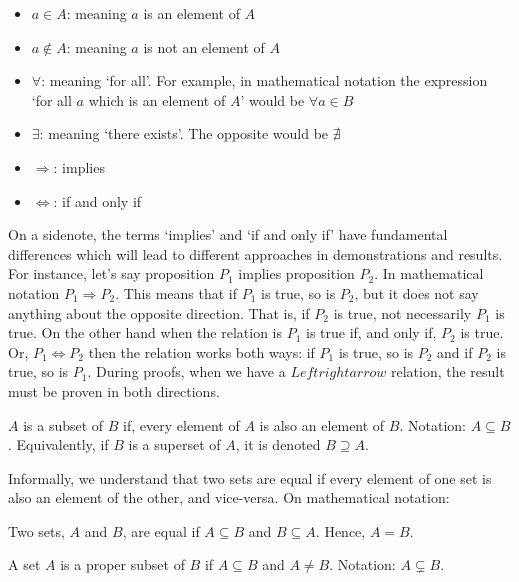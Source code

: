 \begin{itemize}
    \item $a \in A$: meaning $a$ is an element of $A$
    \item $a \notin A$: meaning $a$ is not an element of $A$
    \item $\forall$: meaning `for all'. For example, in mathematical notation the expression `for all $a$ which is an element of $A$' would be $\forall a \in B$
    \item $\exists$: meaning `there exists'. The opposite would be $\nexists$
    \item $\Rightarrow$: implies
    \item $\Leftrightarrow$: if and only if
\end{itemize}

On a sidenote, the terms `implies' and `if and only if' have fundamental differences which will lead to different approaches in demonstrations and results. For instance, let's say proposition $P_1$ implies proposition $P_2$. In mathematical notation $P_1 \Rightarrow P_2$. This means that if $P_1$ is true, so is  $P_2$, but it does not say anything about the opposite direction. That is, if $P_2$ is true, not necessarily $P_1$ is true. On the other hand when the relation is $P_1$ is true if, and only if, $P_2$ is true. Or, $P_1 \Leftrightarrow P_2$ then the relation works both ways: if $P_1$ is true, so is $P_2$ and if $P_2$ is true, so is $P_1$. During proofs, when we have a $Leftrightarrow$ relation, the result must be proven in both directions.

\begin{definition}[Subset]
    $A$ is a subset of $B$ if, every element of $A$ is also an element of $B$. Notation: $A \subseteq B$. Equivalently, if $B$ is a superset of $A$, it is denoted $B \supseteq A$.
\end{definition}

Informally, we understand that two sets are equal if every element of one set is also an element of the other, and vice-versa. On mathematical notation:

\begin{definition}
    Two sets, $A$ and $B$, are equal if $A \subseteq B$ and $B \subseteq A$. Hence, $A = B$.
\end{definition}

\begin{definition}
    A set $A$ is a proper subset of $B$ if $A \subseteq B$ and $A \neq B$. Notation: $A \subsetneq B$.
\end{definition}

